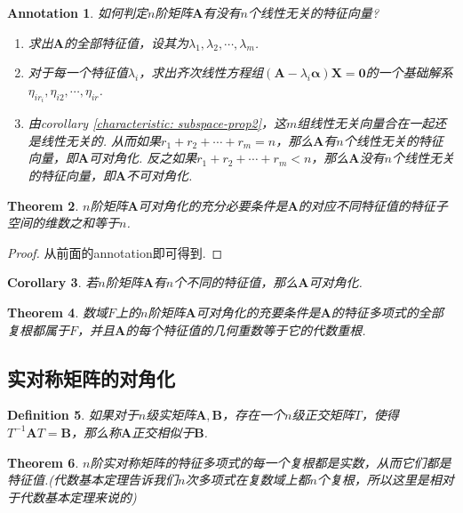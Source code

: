 \documentclass{article}
\newtheorem{theorem}{Theorem}[section]
\newtheorem{corollary}[theorem]{Corollary}
\newtheorem{definition}[theorem]{Definition}
\newtheorem{annotation}[theorem]{Annotation}
\newcommand{\mbf}[1]{\bm{#1}}
\begin{document}
\begin{annotation}
\rm {\color{red} 如何判定$n$阶矩阵$\mbf{A}$有没有$n$个线性无关的特征向量}?
\begin{enumerate}
	\item 求出$\mbf{A}$的全部特征值，设其为$\lambda_1,\lambda_2,\cdots,\lambda_m$.
	\item 对于每一个特征值$\lambda_i$，求出齐次线性方程组$(\mbf{A}-\lambda_i\mbf{\alpha})\mbf{X}=\mbf{0}$的一个基础解系$\eta_{ir_i},\eta_{i2},\cdots,\eta_{ir}$.
	\item 由corollary \ref{characteristic: subspace-prop2}，这$m$组线性无关向量合在一起还是线性无关的. 从而如果$r_1+r_2+\cdots+r_m = n$，那么$\mbf{A}$有$n$个线性无关的特征向量，即$\mbf{A}$可对角化. 反之如果$r_1+r_2+\cdots+r_m < n$，那么$\mbf{A}$没有$n$个线性无关的特征向量，即$\mbf{A}$不可对角化. 
\end{enumerate}
\end{annotation}

\begin{theorem}
\rm $n$阶矩阵$\mbf{A}$可对角化的充分必要条件是$\mbf{A}$的对应不同特征值的特征子空间的维数之和等于$n$.
\end{theorem}

\begin{proof}
\rm 从前面的annotation即可得到.
\end{proof}

\begin{corollary}
\rm 若$n$阶矩阵$\mbf{A}$有$n$个不同的特征值，那么$\mbf{A}$可对角化. 
\end{corollary}

\begin{theorem}
\rm 数域$F$上的$n$阶矩阵$\mbf{A}$可对角化的充要条件是$\mbf{A}$的特征多项式的全部复根都属于$F$，并且$\mbf{A}$的每个特征值的几何重数等于它的代数重根.
\end{theorem}

\newpage
\subsection{实对称矩阵的对角化}

\begin{definition}
\rm 如果对于$n$级实矩阵$\mbf{A},\mbf{B}$，存在一个$n$级正交矩阵$T$，使得$T^{-1}\mbf{A}T=\mbf{B}$，那么称$\mbf{A}$正交相似于$\mbf{B}$.
\end{definition}

\begin{theorem}\label{symmetry: real}
\rm $n$阶实对称矩阵的特征多项式的每一个复根都是实数，从而它们都是特征值.({\color{blue}代数基本定理告诉我们$n$次多项式在复数域上都$n$个复根，所以这里是相对于代数基本定理来说的})
\end{theorem}
\end{document}
